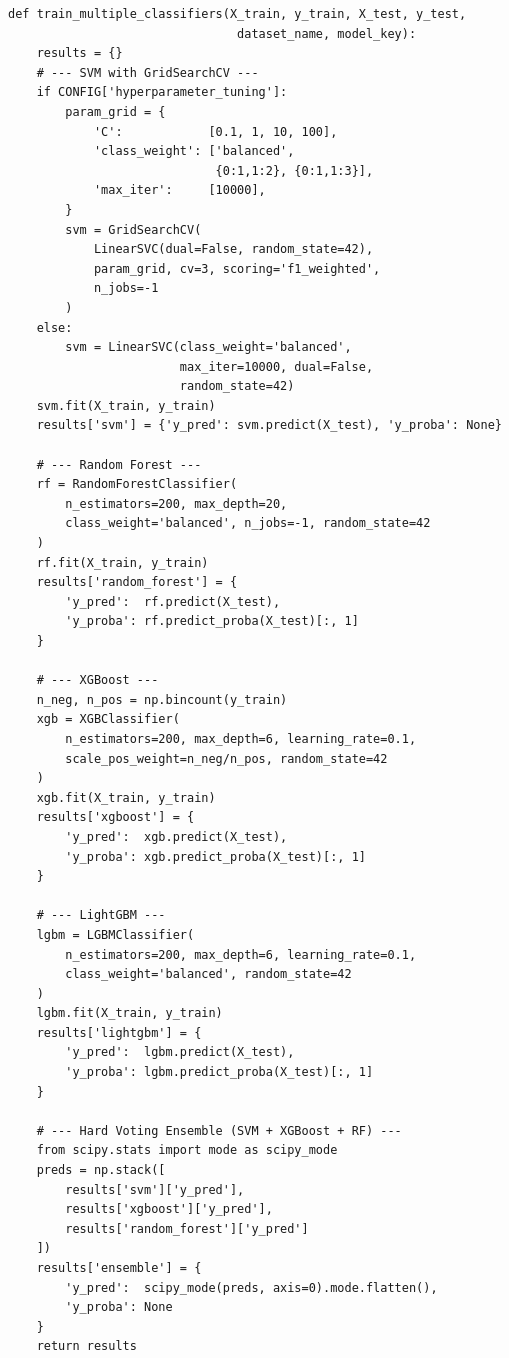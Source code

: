 \documentclass[11pt, titlepage, bibliography=totoc]{scrreprt}
\begin{document}
\begin{lstlisting}[label=lst:multi-classifier,
  caption={Multi-classifier training function including SVM with GridSearchCV, Random Forest, XGBoost, LightGBM, and a hard-voting ensemble (Iteration~4).}]
def train_multiple_classifiers(X_train, y_train, X_test, y_test,
                                dataset_name, model_key):
    results = {}
    # --- SVM with GridSearchCV ---
    if CONFIG['hyperparameter_tuning']:
        param_grid = {
            'C':            [0.1, 1, 10, 100],
            'class_weight': ['balanced',
                             {0:1,1:2}, {0:1,1:3}],
            'max_iter':     [10000],
        }
        svm = GridSearchCV(
            LinearSVC(dual=False, random_state=42),
            param_grid, cv=3, scoring='f1_weighted',
            n_jobs=-1
        )
    else:
        svm = LinearSVC(class_weight='balanced',
                        max_iter=10000, dual=False,
                        random_state=42)
    svm.fit(X_train, y_train)
    results['svm'] = {'y_pred': svm.predict(X_test), 'y_proba': None}

    # --- Random Forest ---
    rf = RandomForestClassifier(
        n_estimators=200, max_depth=20,
        class_weight='balanced', n_jobs=-1, random_state=42
    )
    rf.fit(X_train, y_train)
    results['random_forest'] = {
        'y_pred':  rf.predict(X_test),
        'y_proba': rf.predict_proba(X_test)[:, 1]
    }

    # --- XGBoost ---
    n_neg, n_pos = np.bincount(y_train)
    xgb = XGBClassifier(
        n_estimators=200, max_depth=6, learning_rate=0.1,
        scale_pos_weight=n_neg/n_pos, random_state=42
    )
    xgb.fit(X_train, y_train)
    results['xgboost'] = {
        'y_pred':  xgb.predict(X_test),
        'y_proba': xgb.predict_proba(X_test)[:, 1]
    }

    # --- LightGBM ---
    lgbm = LGBMClassifier(
        n_estimators=200, max_depth=6, learning_rate=0.1,
        class_weight='balanced', random_state=42
    )
    lgbm.fit(X_train, y_train)
    results['lightgbm'] = {
        'y_pred':  lgbm.predict(X_test),
        'y_proba': lgbm.predict_proba(X_test)[:, 1]
    }

    # --- Hard Voting Ensemble (SVM + XGBoost + RF) ---
    from scipy.stats import mode as scipy_mode
    preds = np.stack([
        results['svm']['y_pred'],
        results['xgboost']['y_pred'],
        results['random_forest']['y_pred']
    ])
    results['ensemble'] = {
        'y_pred':  scipy_mode(preds, axis=0).mode.flatten(),
        'y_proba': None
    }
    return results
\end{lstlisting}
\end{document}
